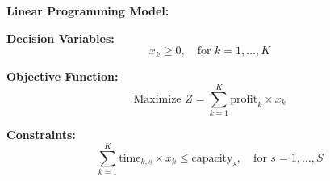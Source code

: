 \documentclass{article}
\begin{document}
\textbf{Linear Programming Model:}

\textbf{Decision Variables:}
\[
x_k \geq 0, \quad \text{for } k = 1, \ldots, K
\]

\textbf{Objective Function:}
\[
\text{Maximize } Z = \sum_{k=1}^{K} \text{profit}_{k} \times x_k
\]

\textbf{Constraints:}
\[
\sum_{k=1}^{K} \text{time}_{k,s} \times x_k \leq \text{capacity}_{s}, \quad \text{for } s = 1, \ldots, S
\]
\end{document}
